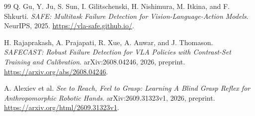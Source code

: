 \documentclass[10pt,letterpaper]{article}
\begin{document}
\begin{thebibliography}{99}
Q. Gu, Y. Ju, S. Sun, I. Gilitschenski, H. Nishimura, M. Itkina, and F. Shkurti.
\emph{SAFE: Multitask Failure Detection for Vision-Language-Action Models}.
NeurIPS, 2025. \url{https://vla-safe.github.io/}.

H. Rajaprakash, A. Prajapati, R. Xue, A. Anwar, and J. Thomason.
\emph{SAFECAST: Robust Failure Detection for VLA Policies with Contrast-Set
Training and Calibration}. arXiv:2608.04246, 2026, preprint.
\url{https://arxiv.org/abs/2608.04246}.

A. Alexiev et al.
\emph{See to Reach, Feel to Grasp: Learning A Blind Grasp Reflex for
Anthropomorphic Robotic Hands}.
arXiv:2609.31323v1, 2026, preprint.
\url{https://arxiv.org/html/2609.31323v1}.
\end{thebibliography}
\end{document}
